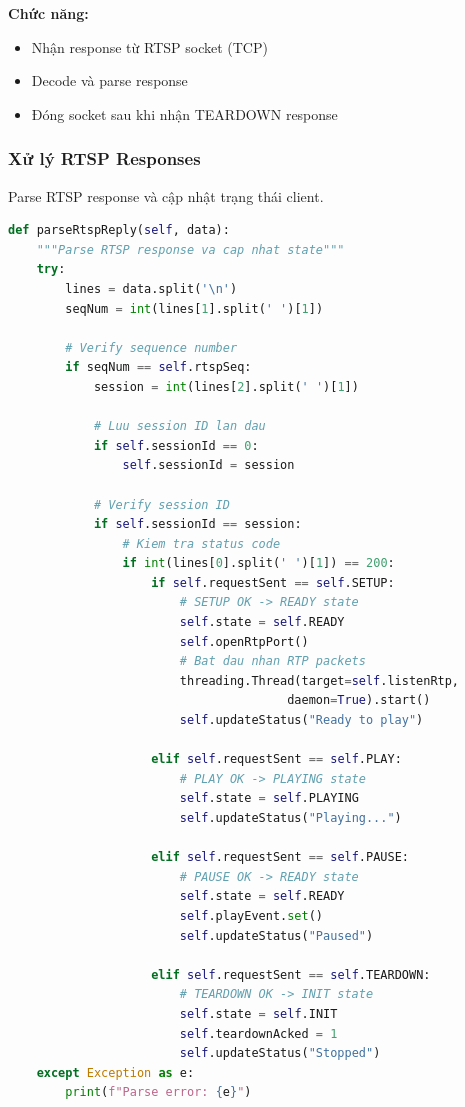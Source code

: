 \documentclass[a4paper,12pt]{article}
\begin{document}
\textbf{Chức năng:}
\begin{itemize}
    \item Nhận response từ RTSP socket (TCP)
    \item Decode và parse response
    \item Đóng socket sau khi nhận TEARDOWN response
\end{itemize}

\subsubsection{Xử lý RTSP Responses}

Parse RTSP response và cập nhật trạng thái client.

\begin{lstlisting}[language=Python, caption={Parse RTSP Response}]
def parseRtspReply(self, data):
    """Parse RTSP response va cap nhat state"""
    try:
        lines = data.split('\n')
        seqNum = int(lines[1].split(' ')[1])

        # Verify sequence number
        if seqNum == self.rtspSeq:
            session = int(lines[2].split(' ')[1])

            # Luu session ID lan dau
            if self.sessionId == 0:
                self.sessionId = session

            # Verify session ID
            if self.sessionId == session:
                # Kiem tra status code
                if int(lines[0].split(' ')[1]) == 200:
                    if self.requestSent == self.SETUP:
                        # SETUP OK -> READY state
                        self.state = self.READY
                        self.openRtpPort()
                        # Bat dau nhan RTP packets
                        threading.Thread(target=self.listenRtp,
                                       daemon=True).start()
                        self.updateStatus("Ready to play")

                    elif self.requestSent == self.PLAY:
                        # PLAY OK -> PLAYING state
                        self.state = self.PLAYING
                        self.updateStatus("Playing...")

                    elif self.requestSent == self.PAUSE:
                        # PAUSE OK -> READY state
                        self.state = self.READY
                        self.playEvent.set()
                        self.updateStatus("Paused")

                    elif self.requestSent == self.TEARDOWN:
                        # TEARDOWN OK -> INIT state
                        self.state = self.INIT
                        self.teardownAcked = 1
                        self.updateStatus("Stopped")
    except Exception as e:
        print(f"Parse error: {e}")
\end{lstlisting}
\end{document}

